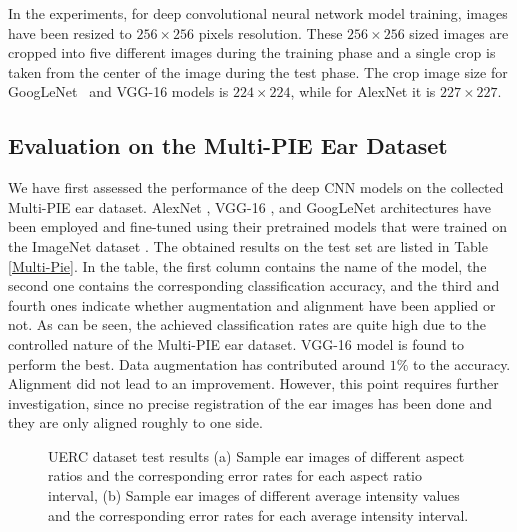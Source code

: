 \documentclass[11pt,journal,compsoc]{IEEEtran}
\begin{document}
In the experiments, for deep convolutional neural network model training, images have been resized to $256 \times 256$ pixels resolution. These $256 \times 256$ sized images are cropped into five different images during the training phase and a single crop is taken from the center of the image during the test phase. The crop image size for GoogLeNet~\cite{Szegedy_2015} and VGG-16 \cite{Simonyan_2014} models is $224 \times 224$, while for AlexNet \cite{Krizhevsky_2012} it is $227 \times 227$.

\subsection{Evaluation on the Multi-PIE Ear Dataset}
We have first assessed the performance of the deep CNN models on the collected Multi-PIE ear dataset. AlexNet \cite{Krizhevsky_2012}, VGG-16 \cite{Simonyan_2014}, and GoogLeNet \cite{Szegedy_2015} architectures have been employed and fine-tuned using their pretrained models that were trained on the ImageNet dataset \cite{Deng_2009}. The obtained results on the test set are listed in Table \ref{Multi-Pie}. In the table, the first column contains the name of the model, the second one contains the corresponding classification accuracy, and the third and fourth ones indicate whether augmentation and alignment have been applied or not. As can be seen, the achieved classification rates are quite high due to the controlled nature of the Multi-PIE ear dataset. VGG-16 model \cite{Simonyan_2014} is found to perform the best. Data augmentation has contributed around $1\%$ to the accuracy. Alignment did not lead to an improvement. However, this point requires further investigation, since no precise registration of the ear images has been done and they are only aligned roughly to one side. 



\begin{figure*}[t]
	\caption{UERC dataset test results (a) Sample ear images of different aspect ratios and the corresponding error rates for each aspect ratio interval, (b) Sample ear images of different average intensity values and the corresponding error rates for each average intensity interval.}
	\label{fig_error_rate}
\end{figure*}
\end{document}
